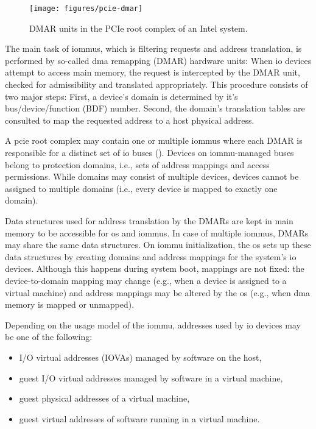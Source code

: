 \begin{figure}
    \centering
    \texttt{[image: figures/pcie-dmar]}
    \caption{DMAR units in the PCIe root complex of an Intel system.}
    \label{fig:pcie-dmar}
\end{figure}

The main task of \acp{iommu}, which is filtering requests and address
translation, is performed by so-called \ac{dma} remapping (DMAR) hardware units:
When \ac{io} devices attempt to access main memory, the request is intercepted
by the DMAR unit, checked for admissibility and translated appropriately. This
procedure consists of two major steps: First, a device's domain is determined by
it's bus/device/function (BDF) number. Second, the domain's translation tables
are consulted to map the requested address to a host physical address.

A \ac{pcie} root complex may contain one or multiple \acp{iommu} where each DMAR
is responsible for a distinct set of \ac{io} buses ().
Devices on \ac{iommu}-managed buses belong to protection domains, i.e., sets of
address mappings and access permissions. While domains may consist of multiple
devices, devices cannot be assigned to multiple domains (i.e., every device is
mapped to exactly one domain).

Data structures used for address translation by the DMARs are kept in main
memory to be accessible for \ac{os} and \acp{iommu}. In case of multiple
\acp{iommu}, DMARs may share the same data structures. On \ac{iommu}
initialization, the \ac{os} sets up these data structures by creating domains
and address mappings for the system's \ac{io} devices. Although this happens
during system boot, mappings are not fixed: the device-to-domain mapping may
change (e.g., when a device is assigned to a virtual machine) and address
mappings may be altered by the \ac{os} (e.g., when \ac{dma} memory is mapped or
unmapped).

Depending on the usage model of the \ac{iommu}, addresses used by \ac{io}
devices may be one of the following:

\begin{itemize}
    \item I/O virtual addresses (IOVAs) managed by software on the host,
    \item guest I/O virtual addresses managed by software in a virtual
        machine,
    \item guest physical addresses of a virtual machine,
    \item guest virtual addresses of software running in a virtual machine.
\end{itemize}

